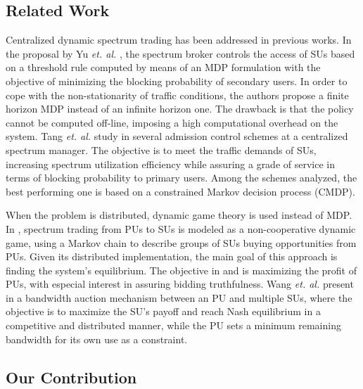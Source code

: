 \subsection{Related Work}\label{sec:Application}

Centralized dynamic spectrum trading has been addressed in previous works. In the proposal by Yu \textit{et. al.} \cite{ref:Yu2007}, the spectrum broker controls the access of SUs based on a threshold rule computed by means of an MDP formulation with the objective of minimizing the blocking probability of secondary users. In order to cope with the non-stationarity of traffic conditions, the authors propose a finite horizon MDP instead of an infinite horizon one. The drawback is that the policy cannot be computed off-line, imposing a high computational overhead on the system.
Tang \textit{et. al.} study in \cite{ref:Kay_Tang2009} several admission control schemes at a centralized spectrum manager. The objective is to meet the traffic demands of SUs, increasing spectrum utilization efficiency while assuring a grade of service in terms of blocking probability to primary users. Among the schemes analyzed, the best performing one is based on a constrained Markov decision process (CMDP).

When the problem is distributed, dynamic game theory is used instead of MDP.
In \cite{ref:Niyato2009_Dyn}, spectrum trading from PUs to SUs is modeled as a non-cooperative dynamic game, using a Markov chain to describe groups of SUs buying opportunities from PUs. Given its distributed implementation, the main goal of this approach is finding the system's equilibrium. The objective in \cite{ref:Zhou2008} and \cite{ref:Jia2009_Rev} is maximizing the profit of PUs, with especial interest in assuring bidding truthfulness. Wang \textit{et. al.} present in \cite{ref:Wang2010_Spec} a bandwidth auction mechanism between an PU and multiple SUs, where the objective is to maximize the SU's payoff and reach Nash equilibrium in a competitive and distributed manner, while the PU sets a minimum remaining bandwidth for its own use as a constraint. 

\subsection{Our Contribution}

